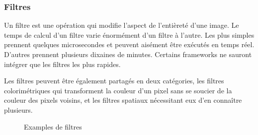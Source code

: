 			\subsubsection{Filtres}
				Un filtre est une opération qui modifie l'aspect de l'entièreté d'une image. Le temps de calcul d'un filtre varie
				énormément d'un filtre à l'autre. Les plus simples prennent quelques microsecondes et peuvent aisément être exécutés
				en temps réel. D'autres prennent plusieurs dixaines de minutes. Certains frameworks ne sauront intégrer que les filtres
				les plus rapides. 

				Les filtres peuvent être également partagés en deux catégories, les filtres colorimétriques qui transforment
				la couleur d'un pixel sans se soucier de la couleur des pixels voisins,  et les filtres spatiaux nécessitant 
				eux d'en connaître plusieurs. 
				\begin{figure}[h]
					\centering
					\caption{Examples de filtres}
					\label{fig:filtres}
				\end{figure}
